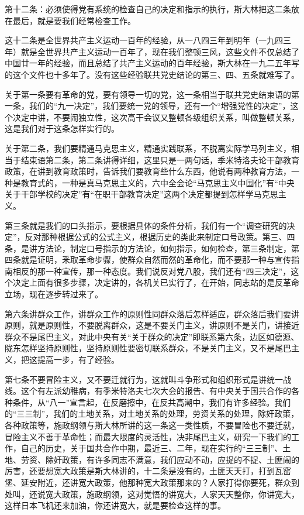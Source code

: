 第十二条：必须使得党有系统的检查自己的决定和指示的执行，斯大林把这二条放在最后，就是要我们经常检查工作。

这十二条是全世界共产主义运动一百年的经验，从一八四三年到明年（一九四三年）就是全世界共产主义运动一百年了，现在我们整顿三风，这些文件不仅总结了中国廿一年的经验，而且总结了共产主义运动的百年经验，斯大林在一九二五年写的这个文件也十多年了。没有这些经验联共党史结论的第三、四、五条就难写了。

关于第一条要有革命的党，要有领导一切的党，这一条相当于联共党史结束语的第一条，我们的“九一决定”，我们要统一党的领导，还有一个“增强党性的决定”，这个决定中讲，不要闹独立性，这次高干会议又整顿各级组织关系，叫做整顿关系，这是我们对于这条怎样实行的。

关于第二条，我们要精通马克思主义，精通实践联系，不脱离实际学马列主义，相当于结束语第二条，第二条讲得详细，这里只是一两句话，季米特洛夫论干部教育政策，在讲到教育政策时，告诉我们要教育些什么东西，他说有两种教育方法，一种是教育式的，一种是真马克思主义的，六中全会论“马克思主义中国化”有“中央关于干部学校的决定”有“在职干部教育决定”这两个决定都提到怎样学马克思主义。

第三条就是我们的口头指示，要根据具体的条件分析，我们有一个“调查研究的决定”，反对那种根据公式的公式主义，根据历史的类此来制定口号政策。第三、四条，是讲方法论，制定口号指示的方法论，如何指示，如何检查，第三条制定，第四条就是证明，釆取革命步骤，使群众自然而然的革命化，而不要那一种与宣传指南相反的那一种宣传，那一种态度。我们说反对党八股，我们还有“四三决定”，这个决定上面有很多步骤，决定讲的，各机关已实行了，在开始，同志站的是反革命立场，现在逐步转过来了。

第六条讲群众工作，讲群众工作的原则性同群众落后怎样适应，群众落后我们要讲原则，就是原则性，不要脱离群众，这是不要关门主义，讲原则不是关门，讲接近群众不是尾巴主义，对此中央有关“关于群众的决定”即联系第六条，边区如德源、陇东怎样坚持原则性，坚持原则性要密切联系群众，不是关门主义，又不是尾巴主义，把这提高一步，有了经验。

第七条不要冒险主义，又不要迁就行为，这就叫斗争形式和组织形式是讲统一战线。这个有左派幼稚病，有季米特洛夫七次大会的报告、有中央关于国共合作的各种条件，从“八一”宣言起，在反磨擦中，在反共高潮中，我们有许多经验。我们的“三三制”，我们的土地关系，对土地关系的处理，劳资关系的处理，除奸政策，各种政策等，施政纲领与斯大林所讲的这一条这一类性质，不要冒险也不要迁就，冒险主义不善于革命性；而最大限度的灵活性，决非尾巴主义，研究一下我们的工作，自己的历史，关于国共合作中期，最近三、二年，现在实行的“三三制”、土地、劳资、除奸政策，有许多同志不满意，我们应动不动，应捉的不捉、土匪闹的厉害，还要想宽大政策是斯大林讲的，十二条是没有的，土匪天天打，打到瓦窑堡、延安附近，还讲宽大政策，他那种宽大政策那来的？人家打得你要死，群众到处叫，还说宽大政策，施政纲领，这对觉悟的讲宽大，人家天天整你，你讲宽大，这样日本飞机还来加油，你还讲宽大，就是要检查这样的事。

